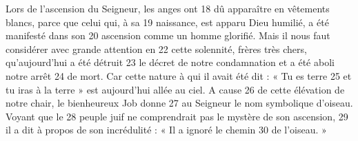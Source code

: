 Lors de l'ascension du Seigneur, les anges ont	 
18	 	dû apparaître en vêtements blancs, parce que celui qui, à sa	 
19	 	naissance, est apparu Dieu humilié, a été manifesté dans son	 
20	 	ascension comme un homme glorifié.
Mais il nous faut considérer avec grande attention en	 
22	 	cette solennité, frères très chers, qu'aujourd'hui a été détruit	 
23	 	le décret de notre condamnation et a été aboli notre arrêt	 
24	 	de mort. Car cette nature à qui il avait été dit : « Tu es terre	 
25	 	et tu iras à la terre » est aujourd'hui allée au ciel. A cause	 
26	 	de cette élévation de notre chair, le bienheureux Job donne	 
27	 	au Seigneur le nom symbolique d'oiseau. Voyant que le	 
28	 	peuple juif ne comprendrait pas le mystère de son ascension,	 
29	 	il a dit à propos de son incrédulité : « Il a ignoré le chemin	 
30	 	de l'oiseau. »